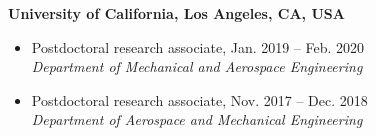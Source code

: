 \documentclass[10pt]{article}
\newenvironment{myitemize}
{ \begin{itemize}
    \setlength{\itemsep}{0pt}
    \setlength{\parskip}{0pt}
    \setlength{\parsep}{0pt}     }
{ \end{itemize}                  }
\begin{document}
{\bf \color{Blue} University of California, Los Angeles, CA, USA} 
\begin{myitemize}
\item  Postdoctoral research associate, Jan. 2019 -- Feb. 2020\\
{\em Department of Mechanical and Aerospace Engineering}
\end{myitemize}

\begin{myitemize}
\item Postdoctoral research associate, Nov. 2017 -- Dec. 2018 \\
{\em Department of Aerospace and Mechanical Engineering}
\end{myitemize}

\end{document}

